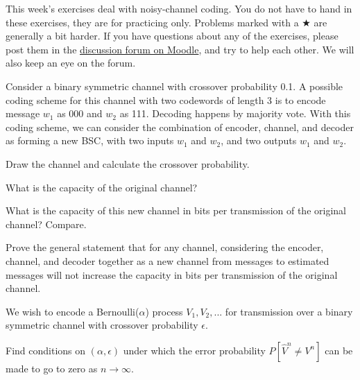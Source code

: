 \documentclass[a4paper,10pt,landscape,twocolumn]{scrartcl}
\begin{document}
\practiceproblems

{\sffamily\noindent
This week's exercises deal with noisy-channel coding. You do not have to hand in these exercises, they are for practicing only. Problems marked with a $\bigstar$ are generally a bit harder. If you have questions about any of the exercises, please post them in the \href{https://www.moodle.ch/lms/mod/forum/view.php?id=2219}{discussion forum on Moodle}, and try to help each other. We will also keep an eye on the forum.
}

\begin{exercise}
Consider a binary symmetric channel with crossover probability 0.1. A possible coding scheme for this channel with two codewords of length 3 is to encode message $w_1$ as 000 and $w_2$ as 111. Decoding happens by majority vote. With this coding scheme, we can consider the combination of encoder, channel, and decoder as forming a new BSC, with two inputs $w_1$ and $w_2$, and two outputs $w_1$ and $w_2$.

\begin{subex}
Draw the channel and calculate the crossover probability.
\end{subex}

\begin{subex}
What is the capacity of the original channel?
\end{subex}

\begin{subex}
What is the capacity of this new channel in bits per transmission of the original channel? Compare.
\end{subex}

\begin{subex}
Prove the general statement that for any channel, considering the encoder, channel, and decoder together as a new channel from messages to estimated messages will not increase the capacity in bits per transmission of the original channel.
\end{subex}

\end{exercise}

\begin{exercise}
We wish to encode a Bernoulli($\alpha$) process $V_1, V_2, ...$ for transmission over a binary symmetric channel with crossover probability $\epsilon$.
\begin{center}
\end{center}
Find conditions on $(\alpha,\epsilon)$ under which the error probability $P[\hat{V}^n \neq V^n]$ can be made to go to zero as $n \to \infty$.
\end{exercise}
\end{document}
